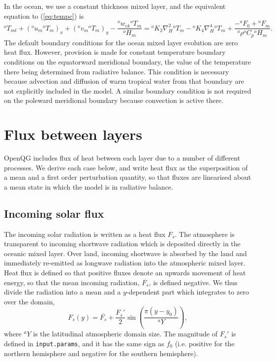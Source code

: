 \documentclass[11pt, a4paper,twoside]{article}
\newcommand{\rhb}[1]{{{}^{#1}\rho}}
\newcommand{\cp}[1]{{{}^{#1}C_p}}
\newcommand{\uu}[2]{{{}^{#1}u_{#2}}}
\newcommand{\vv}[2]{{{}^{#1}v_{#2}}}
\newcommand{\ek}[1]{{{}^{#1}w_{ek}}}
\newcommand{\HH}[2]{{{}^{#1}H_{#2}}}
\newcommand{\kh}[1]{{{}^{#1}K_2}}
\newcommand{\kf}[1]{{{}^{#1}K_4}}
\newcommand{\T}[2]{{{}^{#1}T_{#2}}}
\newcommand{\F}[3]{{{}^{#1}F^{#3}_{#2}}}
\numberwithin{equation}{section}
\begin{document}
In the ocean, we use a constant thickness mixed layer, and the equivalent equation to (\ref{eq:tempc}) is
\begin{equation}\label{eq:tempd}
\T{o}{mt} + (\uu{o}{m} \T{o}{m})_x + (\vv{o}{m}  \T{o}{m})_y - \frac{\ek{o}\T{o}{m}}{\HH{o}{m}}  =  \kh{o}  \nabla_H^2 \T{o}{m}  - \kf{o}  \nabla_H^4 \T{o}{m}   + \frac{- \F{o}{0}{} + \F{o}{m}{}}{\rhb{o} \cp{o} \HH{o}{m}}.
\end{equation}
The default boundary conditions for the ocean mixed layer evolution are zero heat flux.
However, provision is made for constant temperature boundary conditions on the equatorward meridional boundary, the value of the temperature there being determined from radiative balance.
This condition is necessary because advection and diffusion of warm tropical water from that boundary are not explicitly included in the model.
A similar boundary condition is not required on the poleward meridional boundary because convection is active there.

\section{Flux between layers}\label{sec:flux}
OpenQG includes flux of heat between each layer due to a number of different processes.
We derive each case below, and write heat flux as the superposition of a mean and a first order perturbation quantity, so that fluxes are linearised about a mean state in which the model is in radiative balance.

\subsection{Incoming solar flux}
The incoming solar radiation is written as a heat flux $F_s$.
The atmosphere is transparent to incoming shortwave radiation which is deposited directly in the oceanic mixed layer.
Over land, incoming shortwave is absorbed by the land and immediately re-emitted as longwave radiation into the atmospheric mixed layer.
Heat flux is defined so that positive fluxes denote an upwards movement of heat energy, so that the mean incoming radiation, $\overline{F_s}$, is defined negative.
We thus divide the radiation into a mean and a $y$-dependent part which integrates to zero over the domain,
\begin{equation}\label{eq:fspy}
F_s(y) =  \overline{F_s} + \frac{F_s'}{2} \sin\left( \frac{\pi (y - y_0)}{{}^aY}\right),
\end{equation}
where ${}^aY$ is the latitudinal atmospheric domain size.
The magnitude of $F_s'$ is defined in \verb=input.params=, and it has the same sign as $f_0$ (i.e. positive for the northern hemisphere and negative for the southern hemisphere).
\end{document}
